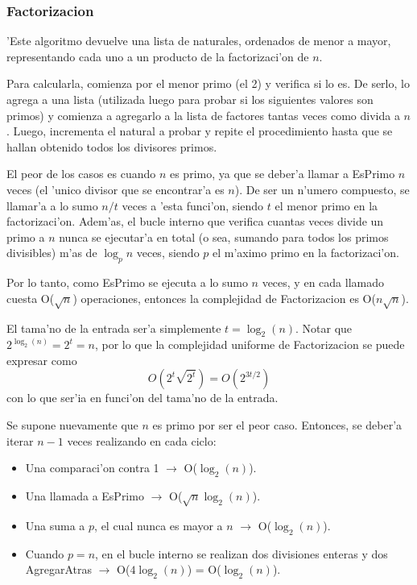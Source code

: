 \subsubsection{Factorizacion}


'Este algoritmo devuelve una lista de naturales, ordenados de menor a mayor, representando cada uno a un producto de la factorizaci'on de $n$. 

Para calcularla, comienza por el menor primo (el 2) y verifica si lo es. De serlo, lo agrega a una lista (utilizada luego para probar si los siguientes valores son primos) y comienza a agregarlo a la lista de factores tantas veces como divida a $n$. Luego, incrementa el natural a probar y repite el procedimiento hasta que se hallan obtenido todos los divisores primos.

El peor de los casos es cuando $n$ es primo, ya que se deber'a llamar a EsPrimo $n$ veces (el 'unico divisor que se encontrar'a es $n$). De ser un n'umero compuesto, se llamar'a a lo sumo $n/t$ veces a 'esta funci'on, siendo $t$ el menor primo en la factorizaci'on. Adem'as, el bucle interno que verifica cuantas veces divide un primo a $n$ nunca se ejecutar'a en total (o sea, sumando para todos los primos divisibles) m'as de $\log_p{n}$ veces, siendo $p$ el m'aximo primo en la factorizaci'on.

Por lo tanto, como EsPrimo se ejecuta a lo sumo $n$ veces, y en cada llamado cuesta O($\sqrt{n}$) operaciones, entonces la complejidad de Factorizacion es O($n\sqrt{n}$).

El tama'no de la entrada ser'a simplemente $t = \log_2(n)$. Notar que $2^{\log_2(n)} = 2^t = n$, por lo que la complejidad uniforme de Factorizacion se puede expresar como 
$$O(2^t\sqrt{2^t}) = O(2^{3t/2})$$
con lo que ser'ia  en funci'on del tama'no de la entrada.

\vspace{2em}


Se supone nuevamente que $n$ es primo por ser el peor caso. Entonces, se deber'a iterar $n-1$ veces realizando en cada ciclo:
\begin{itemize}
\item Una comparaci'on contra 1 $\rightarrow$ O($\log_2(n)$).
\item Una llamada a EsPrimo  $\rightarrow$ O($\sqrt{n}\log_2(n)$).
\item Una suma a $p$, el cual nunca es mayor a $n$  $\rightarrow$ O($\log_2(n)$).
\item Cuando $p = n$, en el bucle interno se realizan dos divisiones enteras y dos AgregarAtras  $\rightarrow$ O($4\log_2(n)$) = O($\log_2(n)$).
\end{itemize}

